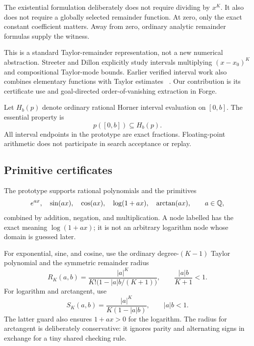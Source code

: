 \documentclass[11pt,a4paper]{article}
\theoremstyle{definition}\newtheorem{definition}[theorem]{Definition}
\newcommand{\code}[1]{\texttt{\detokenize{#1}}}
\begin{document}
The existential formulation deliberately does not require dividing by $x^K$.
It also does not require a globally selected remainder function. At zero, only
the exact constant coefficient matters. Away from zero, ordinary analytic
remainder formulas supply the witness.

This is a standard Taylor-remainder representation, not a new numerical
abstraction. Streeter and Dillon explicitly study intervals multiplying
$(x-x_0)^K$ and compositional Taylor-mode bounds. Earlier verified interval
work also combines elementary functions with Taylor estimates
~\cite{autobound,verified-intervals}. Our contribution is its certificate use
and goal-directed order-of-vanishing extraction in Forge.

Let $H_b(p)$ denote ordinary rational Horner interval evaluation on $[0,b]$.
The essential property is
\[
 p([0,b])\subseteq H_b(p).
\]
All interval endpoints in the prototype are exact fractions. Floating-point
arithmetic does not participate in search acceptance or replay.

\subsection{Primitive certificates}
\label{sec:primitives}

The prototype supports rational polynomials and the primitives
\[
 e^{ax},\quad\sin(ax),\quad\cos(ax),\quad\log(1+ax),\quad\arctan(ax),
 \qquad a\in\mathbb Q,
\]
combined by addition, negation, and multiplication. A node labelled
\code{log1p} has the exact meaning $\log(1+ax)$; it is not an arbitrary logarithm
node whose domain is guessed later.

For exponential, sine, and cosine, use the ordinary degree-$(K-1)$ Taylor
polynomial and the symmetric remainder radius
\begin{equation}\label{eq:expR}
 R_K(a,b)=\frac{|a|^K}{K!\bigl(1-|a|b/(K+1)\bigr)},
 \qquad \frac{|a|b}{K+1}<1.
\end{equation}
For logarithm and arctangent, use
\begin{equation}\label{eq:logR}
 S_K(a,b)=\frac{|a|^K}{K(1-|a|b)},\qquad |a|b<1.
\end{equation}
The latter guard also ensures $1+ax>0$ for the logarithm. The radius for
arctangent is deliberately conservative: it ignores parity and alternating
signs in exchange for a tiny shared checking rule.
\end{document}
